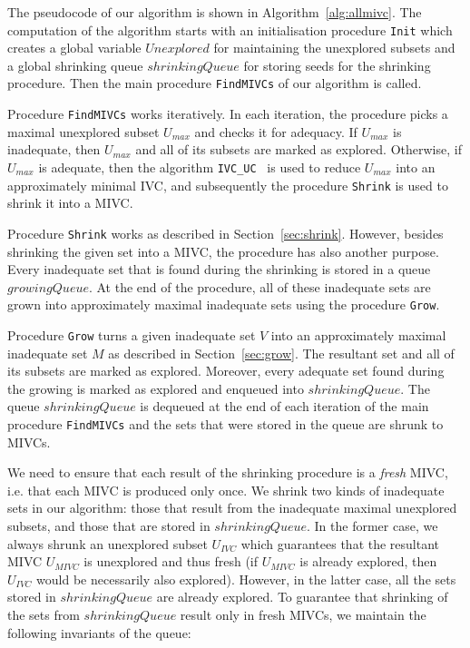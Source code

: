 The pseudocode of our algorithm is shown in Algorithm~\ref{alg:allmivc}. The computation of the algorithm starts with an initialisation procedure \texttt{Init} which creates a global variable $\mathit{Unexplored}$ for maintaining the unexplored subsets and a global shrinking queue $\mathit{shrinkingQueue}$ for storing seeds for the shrinking procedure. Then the main procedure \texttt{FindMIVCs} of our algorithm is called.

Procedure \texttt{FindMIVCs} works iteratively. In each iteration, the procedure picks a maximal unexplored subset $U_{max}$ and checks it for adequacy. If $U_{max}$ is inadequate, then $U_{max}$ and all of its subsets are marked as explored. Otherwise, if $U_{max}$ is adequate, then the algorithm \texttt{IVC\_UC}~\cite{Ghass16} is used to reduce $U_{max}$ into an approximately minimal IVC, and subsequently the procedure \texttt{Shrink} is used to shrink it into a MIVC.

Procedure \texttt{Shrink} works as described in Section~\ref{sec:shrink}. However, besides shrinking the given set into a MIVC, the procedure has also another purpose. Every inadequate set that is found during the shrinking is stored in a queue $\mathit{growingQueue}$. At the end of the procedure, all of these inadequate sets are grown into approximately maximal inadequate sets using the procedure \texttt{Grow}.

Procedure \texttt{Grow} turns a given inadequate set $V$ into an approximately maximal inadequate set $M$ as described in Section~\ref{sec:grow}. The resultant set and all of its subsets are marked as explored. Moreover, every adequate set found during the growing is marked as explored and enqueued into $\mathit{shrinkingQueue}$.
The queue $\mathit{shrinkingQueue}$ is dequeued at the end of each iteration of the main procedure \texttt{FindMIVCs} and the sets that were stored in the queue are shrunk to MIVCs.


We need to ensure that each result of the shrinking procedure is a \emph{fresh} MIVC, i.e. that each MIVC is produced only once.
We shrink two kinds of inadequate sets in our algorithm: those that result from the inadequate maximal unexplored subsets, and those that are stored in $\mathit{shrinkingQueue}$. In the former case, we always shrunk an unexplored subset $U_{\mathit{IVC}}$ which guarantees that the resultant MIVC $U_{\mathit{MIVC}}$ is unexplored and thus fresh (if $U_{\mathit{MIVC}}$ is already explored, then $U_{\mathit{IVC}}$ would be necessarily also explored).
However, in the latter case, all the sets stored in $\mathit{shrinkingQueue}$ are already explored. To guarantee that shrinking of the sets from $\mathit{shrinkingQueue}$ result only in fresh MIVCs, we maintain the following invariants of the queue:


